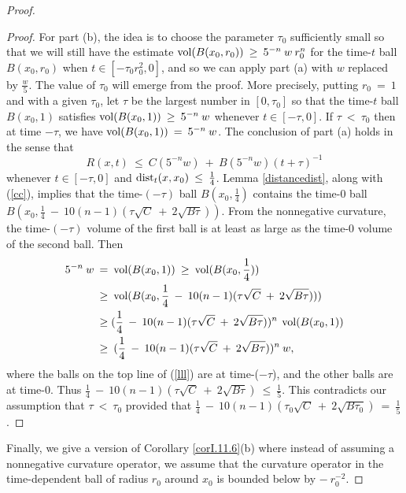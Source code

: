 \begin{proof}
\begin{proof}
For part (b), the idea is to choose the parameter
$\tau_0$ sufficiently small so that
we will still have the estimate
$\operatorname{vol}(B(x_0, r_0)) \: \ge \: 5^{-n} \: w \: r_0^n$ for the time-$t$ ball
$B(x_0, r_0)$ when $t \in [-\tau_0 r_0^2, 0]$,
and so we can apply part (a) with $w$ replaced by $\frac{w}{5}$.
The value of $\tau_0$ will emerge from the proof.
More precisely, putting $r_0 \: = \: 1$ and with a given
$\tau_0$, let $\tau$ be the
largest number in $[0, \tau_0]$ so that the time-$t$ ball
$B(x_0, 1)$ satisfies
$\operatorname{vol}(B(x_0, 1)) \: \ge \: 5^{-n} \: w$ whenever $t \in [-\tau, 0]$.
If $\tau \: < \: \tau_0$ then at time $- \tau$, we have
$\operatorname{vol}(B(x_0, 1)) \: = \: 5^{-n} \: w$.
The conclusion of part (a) holds in the sense that
\begin{equation} \label{cc}
R(x, t) \: \le \: C(5^{-n} w) \: + \: B(5^{-n} w) ( t + \tau)^{-1}
\end{equation}
whenever $t \in [- \tau, 0]$ and $\operatorname{dist}_t(x, x_0) \: \le \: \frac14$.
Lemma \ref{distancedist}, along with (\ref{cc}), implies that the
time-$(- \tau)$ ball $B(x_0, \frac14)$ contains the
time-$0$ ball $B(x_0, \frac14 \: - \: 10(n-1)(\tau \sqrt{C} \: + \:
2 \sqrt{B \tau}))$. From the nonnegative curvature, the
time-$(- \tau)$ volume of the first ball is at least as large as the
time-$0$ volume of the second ball.  Then
\begin{align} \label{lll}
5^{-n} \: w \: & = \: \operatorname{vol}(B(x_0, 1))
\: \ge \: \operatorname{vol}(B(x_0, \frac14)) \\
& \ge \:
\operatorname{vol}(B(x_0, \frac14 \: - \: 10(n-1)(\tau \sqrt{C} \: + \:
2 \sqrt{B \tau}))) \notag \\
& \ge
(\frac14 \: - \: 10(n-1)(\tau \sqrt{C} \: + \:
2 \sqrt{B \tau}))^n \: \operatorname{vol}(B(x_0, 1)) \notag \\
& \ge \:
(\frac14 \: - \: 10(n-1)(\tau \sqrt{C} \: + \:
2 \sqrt{B \tau}))^n \: w, \notag
\end{align}
where the balls on the top line of (\ref{lll}) are at time-($- \tau$),
and the other balls are at time-$0$.
Thus $\frac14 \: - \: 10(n-1)(\tau \sqrt{C} \: + \:
2 \sqrt{B \tau}) \: \le \: \frac15$.
This contradicts our assumption
that $\tau \: < \: \tau_0$ provided that
$\frac14 \: - \: 10(n-1)(\tau_0 \sqrt{C} \: + \:
2 \sqrt{B \tau_0}) \: = \: \frac15$.
\end{proof}

Finally, we give a version of Corollary \ref{corI.11.6}(b)  where instead of assuming a
nonnegative curvature operator, we assume that the
curvature operator
in the time-dependent ball of radius $r_0$ around $x_0$ is bounded below by
$- \: r_0^{-2}$.



\end{proof}
